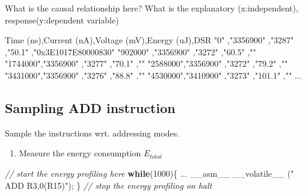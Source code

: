 \documentclass[]{article}
\newenvironment{Shaded}{\begin{snugshade}}{\end{snugshade}}
\newcommand{\CommentTok}[1]{\textcolor[rgb]{0.56,0.35,0.01}{\textit{#1}}}
\newcommand{\ControlFlowTok}[1]{\textcolor[rgb]{0.13,0.29,0.53}{\textbf{#1}}}
\newcommand{\DecValTok}[1]{\textcolor[rgb]{0.00,0.00,0.81}{#1}}
\newcommand{\NormalTok}[1]{#1}
\newcommand{\StringTok}[1]{\textcolor[rgb]{0.31,0.60,0.02}{#1}}
\providecommand{\tightlist}{%
  \setlength{\itemsep}{0pt}\setlength{\parskip}{0pt}}
\begin{document}
What is the causal relationship here? What is the explanatory (x:independent), response(y:dependent variable)

\begin{Shaded}
\begin{Highlighting}[]
\NormalTok{Time (ns),Current (nA),Voltage (mV),Energy (uJ),DSR}
\StringTok{"0"}\NormalTok{      ,}\StringTok{"3356900"}\NormalTok{   ,}\StringTok{"3287"}\NormalTok{      ,}\StringTok{"50.1"}\NormalTok{     ,}\StringTok{"0x3E1017E80000830"}
\StringTok{"902000"}\NormalTok{ ,}\StringTok{"3356900"}\NormalTok{   ,}\StringTok{"3272"}\NormalTok{      ,}\StringTok{"60.5"}\NormalTok{     ,}\StringTok{""}
\StringTok{"1744000"}\NormalTok{,}\StringTok{"3356900"}\NormalTok{   ,}\StringTok{"3277"}\NormalTok{      ,}\StringTok{"70.1"}\NormalTok{     ,}\StringTok{""}
\StringTok{"2588000"}\NormalTok{,}\StringTok{"3356900"}\NormalTok{   ,}\StringTok{"3272"}\NormalTok{      ,}\StringTok{"79.2"}\NormalTok{     ,}\StringTok{""}
\StringTok{"3431000"}\NormalTok{,}\StringTok{"3356900"}\NormalTok{   ,}\StringTok{"3276"}\NormalTok{      ,}\StringTok{"88.8"}\NormalTok{     ,}\StringTok{""}
\StringTok{"4530000"}\NormalTok{,}\StringTok{"3410900"}\NormalTok{   ,}\StringTok{"3273"}\NormalTok{      ,}\StringTok{"101.1"}\NormalTok{    ,}\StringTok{""}
\NormalTok{...}
\end{Highlighting}
\end{Shaded}

\hypertarget{sampling-add-instruction}{%
\subsection{Sampling ADD instruction}\label{sampling-add-instruction}}

Sample the instructions wrt. addressing modes.

\begin{enumerate}
\def\labelenumi{\arabic{enumi}.}
\tightlist
\item
  Measure the energy consumption \(E_{total}\)
\end{enumerate}

\begin{Shaded}
\begin{Highlighting}[]
\CommentTok{// start the energy profiling here}
\ControlFlowTok{while}\NormalTok{(}\DecValTok{1000}\NormalTok{)\{}
\NormalTok{    ...}
\NormalTok{  __asm__ __volatile__ (}\StringTok{" ADD R3,0(R15)"}\NormalTok{);}
\NormalTok{\}}
\CommentTok{// stop the energy profiling on halt}
\end{Highlighting}
\end{Shaded}
\end{document}
